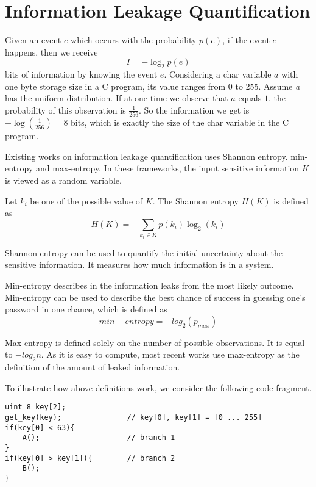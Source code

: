 
\section{Information Leakage Quantification}
 
Given an event $e$ which occurs with the probability $p(e)$, if the event $e$ happens, 
then we receive
\begin{displaymath}
    I = - \log_2p(e)
\end{displaymath}
bits of information by knowing the event $e$.
Considering a char variable $a$ with one byte storage size in a C program, its value 
ranges from 0 to 255.  Assume
 \textit{a} has the uniform distribution. If at one time we observe that $a$
equals $1$, the probability of this observation is $\frac{1}{256}$. So the information we get is 
$-\log(\frac{1}{256}) = 8$ bits, which is exactly the size of the char variable in the C program.

Existing works on information leakage quantification uses Shannon entropy.
min-entropy \cite{10.1007/978-3-642-00596-1_21} and max-entropy.
In these frameworks, the input sensitive
information $K$ is viewed as a random variable. 

Let $k_i$ be one of the possible
value of $K$. The Shannon entropy $H(K)$ is defined as
\begin{displaymath}
    H(K) = - \sum_{k_i {\in} K}p(k_i)\log_2(k_i)
\end{displaymath}

Shannon entropy can be used to quantify the initial uncertainty about the sensitive
information. It measures how much information is in a system.

Min-entropy describes in the information leaks from the most likely outcome.
Min-entropy can be used to describe the best chance of success in guessing 
one's password in one chance, which is defined as 
\begin{displaymath}
    min-entropy = - log_2(p_{max})
\end{displaymath}

Max-entropy is defined solely on the number of possible observations. It is 
equal to $-log_2{n}$. As it is easy to compute, most recent works use 
max-entropy as the definition of the amount of leaked information.

To illustrate how above definitions work, we consider the following
code fragment. 

\begin{lstlisting}[xleftmargin=.03\textwidth,xrightmargin=.01\textwidth]
uint_8 key[2]; 
get_key(key);               // key[0], key[1] = [0 ... 255]
if(key[0] < 63){
    A();                    // branch 1
}
if(key[0] > key[1]){        // branch 2
    B();
}
\end{lstlisting}

